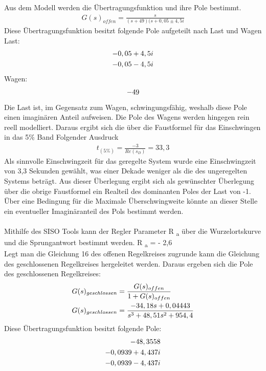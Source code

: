 \documentclass[10pt]{scrartcl}
\begin{document}
Aus dem Modell werden die Übertragungsfunktion und ihre Pole bestimmt.
%
\begin{align}
   G(s)_{offen}=\frac{s}{(s+49)(s+0,05\pm4,5i}
\end{align}
Diese Übertragungsfunktion besitzt folgende Pole aufgeteilt nach Last und Wagen\\ 
Last: 
\begin{align}
-0,05+4,5i  \notag \\
-0,05-4,5i  \notag 
\end{align}
Wagen:
\begin{align}
-49  \notag 
\end{align}
Die Last ist, im Gegensatz zum Wagen, schwingungsfähig, weshalb diese Pole einen imaginären Anteil aufweisen. Die Pole des Wagens werden hingegen rein reell modelliert. 
Daraus ergibt sich die über die Faustformel für das Einschwingen in das 5\% Band Folgender Ausdruck
\begin{align}
t_{(5\%)}=\frac{-3}{Re(s_D)}=33,3
\end{align}
 Als sinnvolle Einschwingzeit für das geregelte System wurde eine Einschwingzeit von  3,3 Sekunden gewählt, was einer Dekade weniger als die des ungeregelten Systems beträgt. Aus dieser Überlegung ergibt sich als gewünschter Überlegung über die obrige Faustformel ein Realteil des dominanten Poles der Last von -1. Über eine Bedingung für die Maximale Überschwingweite könnte an dieser Stelle ein eventueller Imaginäranteil des Pols bestimmt werden.\\ 
\\Mithilfe des SISO Tools kann der Regler Parameter R \textsubscript{a}
über die Wurzelortskurve und die Sprungantwort bestimmt werden.
R \textsubscript{a} = - 2,6 \\
Legt man die Gleichung 16 des offenen Regelkreises zugrunde kann die Gleichung des geschlossenen Regelkreises hergeleitet werden.
Daraus ergeben sich die Pole des geschlossenen Regelkreises:
\begin{align}
G(s)_{geschlossen} &=\frac{G(s)_{offen}}{1+G(s)_{offen}} \notag\\
G(s)_{geschlossen}&=\frac{-34,18s+0,04443}{s^3+48,51s^2+954,4}
\end{align}
Diese Übertragungsfunktion besitzt folgende Pole:
\begin{align}
-48,3558 \notag \\
-0,0939+4,437i  \notag \\
-0,0939-4,437i \notag 
 \end{align} \\
\end{document}
